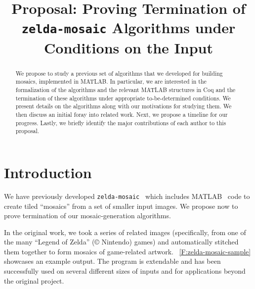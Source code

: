\documentclass[11pt,conference]{IEEEtran}
\begin{document}
\title{Proposal: Proving Termination of \texttt{zelda-mosaic} Algorithms under Conditions on the Input}

\author{
\and
{}
}

\maketitle

\begin{abstract}
    We propose to study a previous set of algorithms that we developed for
    building mosaics, implemented in MATLAB\@. In particular, we are interested
    in the formalization of the algorithms and the relevant MATLAB structures in
    Coq and the termination of these algorithms under appropriate to-be-determined
    conditions. We present details on the algorithms along with our motivations
    for studying them. We then discuss an initial foray into related work.
    Next, we propose a timeline for our progress. Lastly, we briefly identify
    the major contributions of each author to this proposal.
\end{abstract}


\section{Introduction}

We have previously developed \texttt{zelda-mosaic}~\cite{zelda_mosaic} which
includes MATLAB~\cite{matlab} code to create tiled ``mosaics'' from a set of
smaller input images. We propose now to prove termination of our
mosaic-generation algorithms.

In the original work, we took a series of related images (specifically, from one
of the many ``Legend of Zelda'' ({\copyright} Nintendo) games) and automatically
stitched them together to form mosaics of game-related artwork.
\figurename~\ref{F:zelda-mosaic-sample} showcases an example output. The program
is extendable and has been successfully used on several different sizes of
inputs and for applications beyond the original project.
\end{document}
